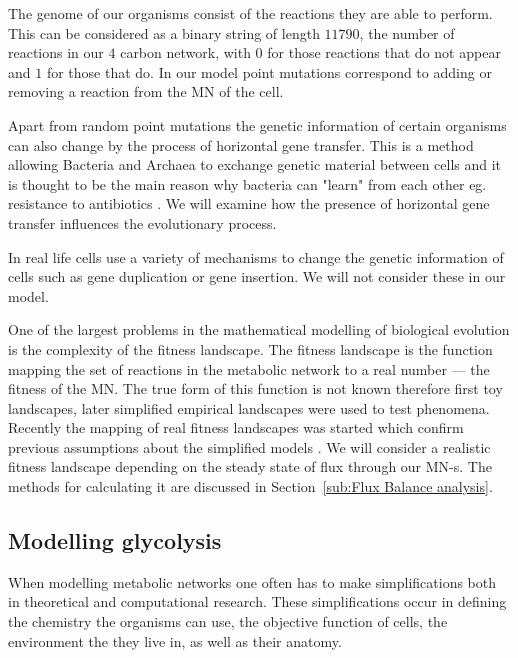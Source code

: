 \documentclass[a4paper,12pt]{article}
\begin{document}
	The genome of our organisms consist of the reactions they are able to perform. This can be considered as a binary string of length $11790$, the number of reactions in our $4$ carbon network, with $0$ for those reactions that do not appear and $1$ for those that do. In our model point mutations correspond to adding or removing a reaction from the MN of the cell.

	Apart from random point mutations the genetic information of certain organisms can also change by the process of horizontal gene transfer. This is a method allowing Bacteria and Archaea to exchange genetic material between cells and it is thought to be the main reason why bacteria can "learn" from each other eg. resistance to antibiotics \cite{horizontalAntibiotics,horizontalgenetransfer}. We will examine how the presence of horizontal gene transfer influences the evolutionary process.

	In real life cells use a variety of mechanisms to change the genetic information of cells such as gene duplication or gene insertion. We will not consider these in our model. 


	One of the largest problems in the mathematical modelling of biological evolution is the complexity of the fitness landscape. The fitness landscape is the function mapping the set of reactions in the metabolic network to a real number --- the fitness of the MN. The true form of this function is not known therefore first toy landscapes, later simplified empirical landscapes were used to test phenomena. Recently the mapping of real fitness landscapes was started which confirm previous assumptions about the simplified models \cite{fitnesslandscape}. We will consider a realistic fitness landscape depending on the steady state of flux through our MN-s. The methods for calculating it are discussed in Section~\ref{sub:Flux Balance analysis}.

	\subsection{Modelling glycolysis}
	\label{sub:artificial_chemistries}


	When modelling metabolic networks one often has to make simplifications both in theoretical and computational research. These simplifications occur in defining the chemistry the organisms can use, the objective function of cells, the environment the they live in, as well as their anatomy. %
	
\end{document}
